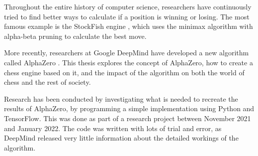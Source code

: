 \documentclass{article}
\begin{document}
Throughout the entire history of computer science, researchers have continuously tried to find better
ways to calculate if a position is winning or losing. The most famous example is the StockFish 
engine \cite{StockfishChess2022}, which uses the minimax algorithm with alpha-beta pruning to calculate the best move.

More recently, researchers at Google DeepMind have developed a new algorithm called AlphaZero \cite{AlphaZero2022}.
This thesis explores the concept of AlphaZero, how to create a chess engine based on it, and the impact of 
the algorithm on both the world of chess and the rest of society.

Research has been conducted by investigating what is needed to recreate the results of AlphaZero, 
by programming a simple implementation using Python and TensorFlow. This was done as part of a research project
between November 2021 and January 2022. The code was written with lots of trial and error, as DeepMind released 
very little information about the detailed workings of the algorithm. 



\end{document}
